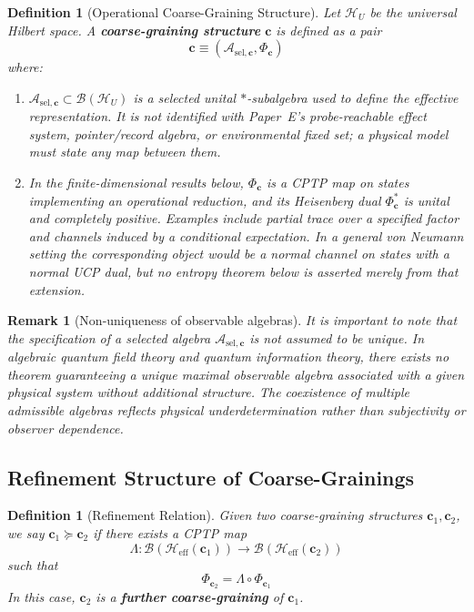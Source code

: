 \documentclass[12pt,a4paper]{article}
\newtheorem{definition}[theorem]{Definition}
\newtheorem{remark}[theorem]{Remark}
\begin{document}
\begin{definition}[Operational Coarse-Graining Structure]
\label{def:coarse}
Let $\mathcal{H}_U$ be the universal Hilbert space. 
A \textbf{coarse-graining structure} $\mathbf{c}$ is defined as a pair
\[
\boxed{\mathbf{c} \equiv (\mathcal{A}_{\mathrm{sel},\mathbf{c}}, \Phi_{\mathbf{c}})}
\]
where:
\begin{enumerate}
\item $\mathcal{A}_{\mathrm{sel},\mathbf{c}} \subset \mathcal{B}(\mathcal{H}_U)$ is a selected unital $*$-subalgebra used to define the effective representation.  It is not identified with Paper~E's probe-reachable effect system, pointer/record algebra, or environmental fixed set; a physical model must state any map between them.
\item In the finite-dimensional results below, $\Phi_{\mathbf{c}}$ is a CPTP map on states implementing an operational reduction, and its Heisenberg dual $\Phi_{\mathbf c}^*$ is unital and completely positive.  Examples include partial trace over a specified factor and channels induced by a conditional expectation.  In a general von Neumann setting the corresponding object would be a normal channel on states with a normal UCP dual, but no entropy theorem below is asserted merely from that extension.
\end{enumerate}
\end{definition}

\begin{remark}[Non-uniqueness of observable algebras]
It is important to note that the specification of a selected algebra $\mathcal{A}_{\mathrm{sel},\mathbf{c}}$ is not assumed to be unique.
In algebraic quantum field theory and quantum information theory, there exists no theorem guaranteeing a unique maximal observable algebra associated with a given physical system without additional structure. 
The coexistence of multiple admissible algebras reflects physical underdetermination rather than subjectivity or observer dependence.
\end{remark}

\subsection{Refinement Structure of Coarse-Grainings}

\begin{definition}[Refinement Relation]
\label{def:refine}
Given two coarse-graining structures $\mathbf{c}_1, \mathbf{c}_2$, we say $\mathbf{c}_1 \succeq \mathbf{c}_2$ if there exists a CPTP map
\[
\Lambda: \mathcal{B}(\mathcal{H}_{\text{eff}}(\mathbf{c}_1)) \to \mathcal{B}(\mathcal{H}_{\text{eff}}(\mathbf{c}_2))
\]
such that
\[
\Phi_{\mathbf{c}_2} = \Lambda \circ \Phi_{\mathbf{c}_1}
\]
In this case, $\mathbf{c}_2$ is a \textbf{further coarse-graining} of $\mathbf{c}_1$.
\end{definition}
\end{document}

